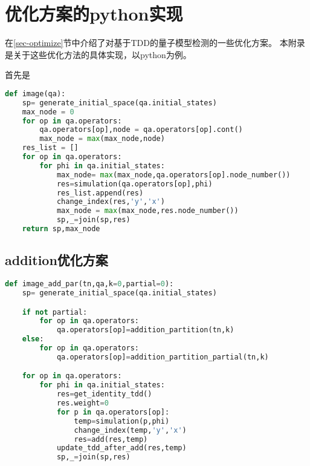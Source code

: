 \thispagestyle{appendixheader}
\setcounter{app_fig}{1}
\setcounter{app_tab}{1}
\setcounter{equation}{0}
\renewcommand\theequation{附\arabic{app}-\arabic{equation}}
\renewcommand\chaptername{附录}
\renewcommand\chaptername{Appendix} 
\renewcommand\thechapter{附录\zhnum{app}} 

\setcounter{chapter}{0}
\setcounter{section}{0}
\chapter{优化方案的python实现}\label{chap:app1}{
在\ref{sec-optimize}节中介绍了对基于TDD的量子模型检测的一些优化方案。
本附录是关于这些优化方法的具体实现，以python为例。

首先是
\begin{lstlisting}[language=Python, caption=Python example]
def image(qa):
    sp= generate_initial_space(qa.initial_states)
    max_node = 0
    for op in qa.operators:
        qa.operators[op],node = qa.operators[op].cont()
        max_node = max(max_node,node)
    res_list = []
    for op in qa.operators:
        for phi in qa.initial_states:
            max_node= max(max_node,qa.operators[op].node_number())
            res=simulation(qa.operators[op],phi)
            res_list.append(res)
            change_index(res,'y','x')
            max_node = max(max_node,res.node_number())
            sp,_=join(sp,res)
    return sp,max_node
\end{lstlisting}
\section*{addition优化方案}
\begin{lstlisting}[language=Python, caption=对量子线路应用addition优化方案]
def image_add_par(tn,qa,k=0,partial=0):
    sp= generate_initial_space(qa.initial_states)

    if not partial:
        for op in qa.operators:
            qa.operators[op]=addition_partition(tn,k)
    else:
        for op in qa.operators:
            qa.operators[op]=addition_partition_partial(tn,k)

    for op in qa.operators:
        for phi in qa.initial_states:
            res=get_identity_tdd()
            res.weight=0
            for p in qa.operators[op]:
                temp=simulation(p,phi)
                change_index(temp,'y','x')
                res=add(res,temp)
            update_tdd_after_add(res,temp)
            sp,_=join(sp,res)


\end{lstlisting}}
